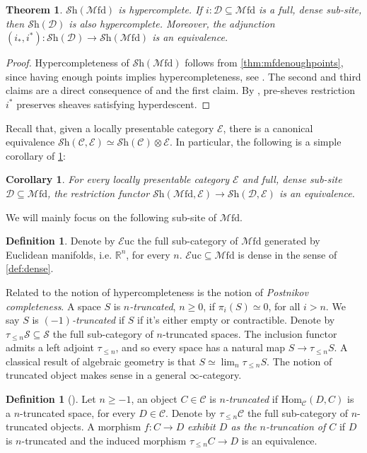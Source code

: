 \documentclass[a4paper]{book}
\newcommand{\lC}{\mathcal{C}}
\newcommand{\lD}{\mathcal{D}}
\newcommand{\lE}{\mathcal{E}}
\newcommand{\lM}{\mathcal{M}}
\newcommand{\bR}{\mathbb{R}}
\newcommand{\lS}{\mathcal{S}}
\newcommand{\Shv}{\lS\mathrm{h}} %
\renewcommand{\hom}{\mathrm{Hom}} %
\newcommand{\Euc}{\lE\mathrm{uc}} %
\newcommand{\Mfd}{\lM\mathrm{fd}} %
\newtheorem{theorem}[equation]{Theorem}
\newtheorem{corollary}[equation]{Corollary}
\theoremstyle{definition}
\newtheorem{definition}[equation]{Definition}
\theoremstyle{remark}
\numberwithin{equation}{section}
\begin{document}
\begin{theorem}\label{thm:mfdhypercomplete}
	$\Shv(\Mfd)$ is hypercomplete. If $i:\lD\subseteq\Mfd$ is a full, dense sub-site, then $\Shv(\lD)$ is also hypercomplete. Moreover, the adjunction $(i_*,i^*):\Shv(\lD)\to\Shv(\Mfd)$ is an equivalence.
\end{theorem}
\begin{proof}
	Hypercompleteness of $\Shv(\Mfd)$ follows from \cref{thm:mfdenoughpoints}, since having enough points implies hypercompleteness, see \cite[Example 3.11.10]{barwick2020exodromy}. The second and third claims are a direct consequence of \cite[Corollary 3.12.13]{barwick2020exodromy} and the first claim. By \cite[Proposition 3.12.11]{barwick2020exodromy}, pre-sheves restriction $i^*$ preserves sheaves satisfying hyperdescent. 
\end{proof}Recall that, given a locally presentable category $\lE$, there is a canonical equivalence $\Shv(\lC,\lE)\simeq\Shv(\lC)\otimes\lE$. In particular, the following is a simple corollary of \cref{thm:mfdhypercomplete}:
\begin{corollary}\label{cor:equivalence}
For every locally presentable category $\lE$ and full, dense sub-site $\lD\subseteq\Mfd$, the restriction functor $\Shv(\Mfd,\lE)\to\Shv(\lD,\lE)$ is an equivalence. 	
\end{corollary}
We will mainly focus on the following sub-site of $\Mfd$.
\begin{definition}
	Denote by $\Euc$ the full sub-category of $\Mfd$ generated by Euclidean manifolds, i.e. $\bR^n$, for every $n$. $\Euc\subseteq\Mfd$ is dense in the sense of \cref{def:dense}. 
\end{definition}
Related to the notion of hypercompleteness is the notion of \emph{Postnikov completeness}. A space $S$ is \emph{$n$-truncated}, $n\geq0$, if $\pi_i(S)\simeq0$, for all $i>n$. We say $S$ is \emph{$(-1)$-truncated} if $S$ if it's either empty or contractible. Denote by $\tau_{\leq n}\lS\subseteq\lS$ the full sub-category of $n$-truncated spaces. The inclusion functor admits a left adjoint $\tau_{\leq n}$, and so every space has a natural map $S\to\tau_{\leq n}S$. A classical result of algebraic geometry is that $S\simeq\lim_n\tau_{\leq n}S$. The notion of truncated object makes sense in a general $\infty$-category. 
\begin{definition}[{\cite[Definition 5.5.6.1]{lurie2009htt}}]
	Let $n\geq-1$, an object $C\in\lC$ is $n$\emph{-truncated} if $\hom_\lC(D,C)$ is a $n$-truncated space, for every $D\in\lC$. Denote by $\tau_{\leq n}\lC$ the full sub-category of $n$-truncated objects. A morphism $f:C\to D$ \emph{exhibit $D$ as the $n$-truncation of $C$} if $D$ is $n$-truncated and the induced morphism $\tau_{\leq n}C\to D$ is an equivalence. 
\end{definition}
\end{document}
